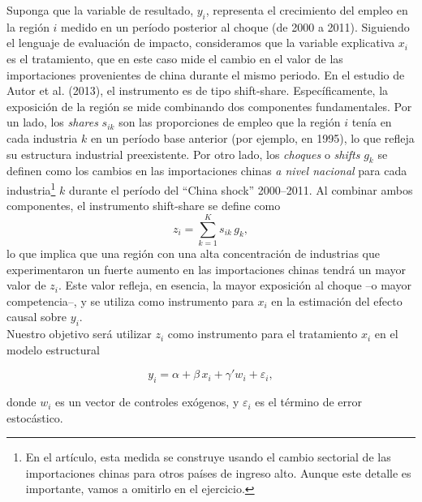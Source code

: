 \documentclass[a4paper, answers, addpoints, 11pt]{exam}
\begin{document}
Suponga que la variable de resultado, \(y_i\), representa el crecimiento del empleo en la región \(i\) medido en un período posterior al choque (de 2000 a 2011). Siguiendo el lenguaje de evaluación de impacto, consideramos que la variable explicativa \(x_i\) es el tratamiento, que en este caso mide el cambio en el valor de las importaciones provenientes de china durante el mismo periodo. En el estudio de Autor et al. (2013), el instrumento es de tipo shift-share. Específicamente, la exposición de la región se mide combinando dos componentes fundamentales. Por un lado, los \emph{shares} \(s_{ik}\) son las proporciones de empleo que la región \(i\) tenía en cada industria \(k\) en un período base anterior (por ejemplo, en 1995), lo que refleja su estructura industrial preexistente. Por otro lado, los \emph{choques} o \emph{shifts} \(g_k\) se definen como los cambios en las importaciones chinas \textit{a nivel nacional} para cada industria\footnote{En el artículo, esta medida se construye usando el cambio sectorial de las importaciones chinas para otros países de ingreso alto. Aunque este detalle es importante, vamos a omitirlo en el ejercicio.} \(k\) durante el período del ``China shock'' 2000–2011. Al combinar ambos componentes, el instrumento shift-share se define como
\[
z_i = \sum_{k=1}^{K} s_{ik}\,g_k, \label{eq:shift-share} \tag{1}
\]
lo que implica que una región con una alta concentración de industrias que experimentaron un fuerte aumento en las importaciones chinas tendrá un mayor valor de \(z_i\). Este valor refleja, en esencia, la mayor exposición al choque –o mayor competencia–, y se utiliza como instrumento para \(x_i\) en la estimación del efecto causal sobre \(y_i\). \\

Nuestro objetivo será utilizar \(z_i\) como instrumento para el tratamiento \(x_i\) en el modelo estructural

\[
y_i = \alpha +\beta\,x_i + \gamma' w_i + \varepsilon_i,
\]

donde \(w_i\) es un vector de controles exógenos, y \(\varepsilon_i\) es el término de error estocástico.
\end{document}
